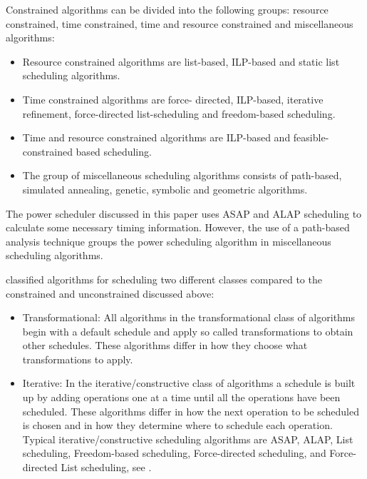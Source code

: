 \documentclass[conference]{IEEEtran}
\begin{document}
Constrained algorithms can be divided into the following groups: resource constrained, time constrained, time and resource constrained and miscellaneous algorithms:
\begin{itemize}
    \item Resource constrained algorithms are list-based, ILP-based and static list scheduling algorithms.
    \item Time constrained algorithms are force- directed, ILP-based, iterative refinement, force-directed list-scheduling and freedom-based scheduling.
    \item Time and resource constrained algorithms are ILP-based and feasible-constrained based scheduling.
    \item The group of miscellaneous scheduling algorithms consists of path-based, simulated annealing, genetic, symbolic and geometric algorithms. 
\end{itemize}   

The power scheduler discussed in this paper uses ASAP and ALAP scheduling to calculate some necessary timing information. However, the use of a path-based analysis technique groups the power scheduling algorithm in miscellaneous scheduling algorithms.  

\cite{52214} classified algorithms for scheduling two different classes compared to the constrained and unconstrained discussed above: 
\begin{itemize}
    \item Transformational: All algorithms in the transformational class of algorithms begin with a default schedule and apply so called transformations to obtain other schedules. These algorithms differ in how they choose what transformations to apply.
    \item Iterative:  In the iterative/constructive class of algorithms a schedule is built up by adding operations one at a time until all the operations have been scheduled. These algorithms differ in how the next operation to be scheduled is chosen and in how they determine where to schedule each operation. Typical iterative/constructive scheduling algorithms are ASAP, ALAP, List scheduling, Freedom-based scheduling, Force-directed scheduling, and Force-directed List scheduling, see \cite{german97}.
\end{itemize}
\end{document}
